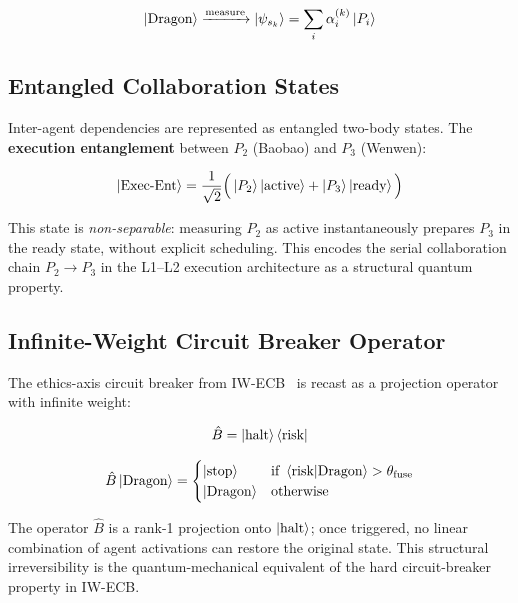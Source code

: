\documentclass[conference]{IEEEtran}
\begin{document}
\begin{equation}
  \ket{\text{Dragon}} \xrightarrow{\text{measure}} \ket{\psi_{s_k}}
  = \sum_{i} \alpha_i^{(k)} \ket{P_i}
  \label{eq:collapse}
\end{equation}

\subsection{Entangled Collaboration States}

Inter-agent dependencies are represented as entangled
two-body states. The \textbf{execution entanglement}
between $P_2$ (Baobao) and $P_3$ (Wenwen):

\begin{equation}
  \ket{\text{Exec-Ent}} = \frac{1}{\sqrt{2}}
  \Big( \ket{P_2}\ket{\text{active}} + \ket{P_3}\ket{\text{ready}} \Big)
  \label{eq:entangle}
\end{equation}

This state is \textit{non-separable}: measuring $P_2$ as
active instantaneously prepares $P_3$ in the ready state,
without explicit scheduling. This encodes the serial
collaboration chain $P_2 \to P_3$ in the L1--L2 execution
architecture as a structural quantum property.

\subsection{Infinite-Weight Circuit Breaker Operator}

The ethics-axis circuit breaker from IW-ECB~\cite{iwecb2026}
is recast as a projection operator with infinite weight:

\begin{equation}
  \hat{B} = \ket{\text{halt}}\bra{\text{risk}}
  \label{eq:fuse_op}
\end{equation}

\begin{equation}
  \hat{B}\ket{\text{Dragon}} =
  \begin{cases}
    \ket{\text{stop}} & \text{if } \braket{\text{risk}}{\text{Dragon}}
                        > \theta_{\text{fuse}} \\
    \ket{\text{Dragon}} & \text{otherwise}
  \end{cases}
  \label{eq:fuse}
\end{equation}

The operator $\hat{B}$ is a rank-1 projection onto
$\ket{\text{halt}}$; once triggered, no linear combination
of agent activations can restore the original state.
This structural irreversibility is the quantum-mechanical
equivalent of the hard circuit-breaker property in IW-ECB.
\end{document}
